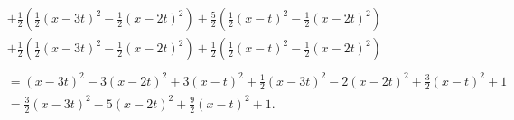 \documentclass[10pt]{mypackage}
\begin{document}
\begin{solution}
\begin{enumerate}[(i)]
\begin{align*}
                            &+ \frac{1}{2}\left( \frac{1}{2}\left( x-3t \right)^2 - \frac{1}{2}\left( x-2t \right)^2 \right) + \frac{5}{2}\left( \frac{1}{2}\left( x-t \right)^2 - \frac{1}{2}\left( x-2t \right)^2 \right)\\
                            &+ \frac{1}{2}\left( \frac{1}{2}\left( x-3t \right)^2 - \frac{1}{2}\left( x-2t \right)^2 \right) + \frac{1}{2}\left( \frac{1}{2}\left( x-t \right)^2-\frac{1}{2}\left( x-2t \right)^2 \right)\\
                            \\
                            &= \left( x-3t \right)^2 - 3\left( x-2t \right)^2 + 3\left( x-t \right)^2 + \frac{1}{2}\left( x-3t \right)^2 - 2\left( x-2t \right)^2 + \frac{3}{2}\left( x-t \right)^2 + 1\\
                            &= \frac{3}{2}\left( x-3t \right)^2 - 5\left( x-2t \right)^2 + \frac{9}{2}\left( x-t \right)^2 + 1.
      \end{align*}
  \end{enumerate}
\end{solution}
\end{document}
